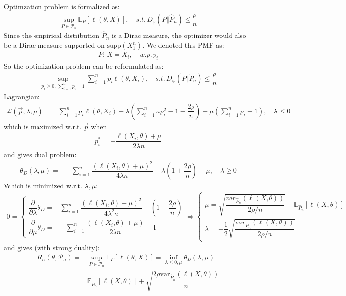 \documentclass[11pt,a4paper]{ctexart}
\numberwithin{equation}{section}%
\begin{document}
Optimzation problem is formalized as:
\begin{align*}
    \mathop{ \sup }\limits_{P\in\mathcal{P}_n }\mathbb{E}_P\left[ \ell(\theta ,X) \right] ,\quad s.t.\, D_\varphi (P\Vert \hat{P}_n) \leq\dfrac{ \rho  }{ n } 
\end{align*}
Since the empirical distribution $ \hat{P}_n $ is a Dirac measure, the optimizer would also be a Dirac measure supported on $ \mathrm{ supp }(X_1^n)  $. We denoted this PMF as:
\begin{align*}
    P:\, X=X_i,\quad w.p. \, p_i 
\end{align*}
So the optimization problem can be reformulated as:
\begin{align*}
    \mathop{ \sup }\limits_{p_i\geq 0,\,\sum_{i=1}^n p_i=1}\sum_{i=1}^n p_i\ell(\theta ,X_i) ,\quad s.t.\, D_\varphi (P\Vert \hat{P}_n) \leq\dfrac{ \rho  }{ n } 
\end{align*}
Lagrangian:
\begin{align*}
    \mathcal{L}(\vec{p};\lambda ,\mu )=& \sum_{i=1}^n p_i\ell(\theta ,X_i) + \lambda \left( \sum_{i=1}^n np_i^2 - 1 - \dfrac{ 2\rho  }{ n }  \right) + \mu \left( \sum_{i=1}^n p_i - 1 \right),\quad \lambda \leq 0
\end{align*}
which is maximized w.r.t. $ \vec{p} $ when 
\begin{align*}
    p_i^* = - \dfrac{ \ell(X_i,\theta )+\mu  }{ 2\lambda n }
\end{align*}
and gives dual problem:
\begin{align*}
     \theta _D(\lambda ,\mu )=& -\sum_{i=1}^n \dfrac{ (\ell(X_i,\theta )+\mu )^2 }{ 4\lambda n }-\lambda (1+\dfrac{ 2\rho  }{ n } ) -\mu ,\quad \lambda \geq 0 
\end{align*}
Which is minimized w.r.t. $ \lambda ,\mu  $:
\begin{align*}
    0=\begin{cases}
        \dfrac{\partial^{}  }{\partial \lambda ^{} }\theta _D =& \sum_{i=1}^n \dfrac{ (\ell(X_i,\theta )+\mu )^2 }{ 4\lambda ^2n }- (1+\dfrac{ 2\rho  }{ n } ) \\
    \dfrac{\partial^{}  }{\partial \mu ^{} }\theta _D =& -\sum_{i=1}^n \dfrac{ (\ell(X_i,\theta )+\mu ) }{ 2\lambda n }-1
    \end{cases} \Rightarrow \begin{cases}
        \mu =\sqrt{\dfrac{ var_{\hat{P}_n}(\ell(X,\theta )) }{ 2\rho /n } } - \mathbb{E}_{\hat{P}_n}\left[ \ell(X,\theta ) \right] \\
        \lambda =-\dfrac{ 1 }{ 2 } \sqrt{\dfrac{ var_{\hat{P}_n}(\ell(X,\theta )) }{ 2\rho /n } }
    \end{cases}
\end{align*}
and gives (with strong duality):
\begin{align*}
    R_n(\theta ,\mathcal{P}_n)=&  \mathop{ \sup }\limits_{P\in\mathcal{P}_n }\mathbb{E}_P\left[ \ell(\theta ,X) \right] = \mathop{ \inf }\limits_{\lambda \leq 0,\mu }\theta _D(\lambda ,\mu ) \\
    =& \mathbb{E}_{\hat{P}_n}\left[ \ell(X,\theta ) \right] + \sqrt{\dfrac{2\rho \mathrm{var}_{\hat{P}_n}(\ell(X,\theta )) }{  n } }
\end{align*}
\end{document}
